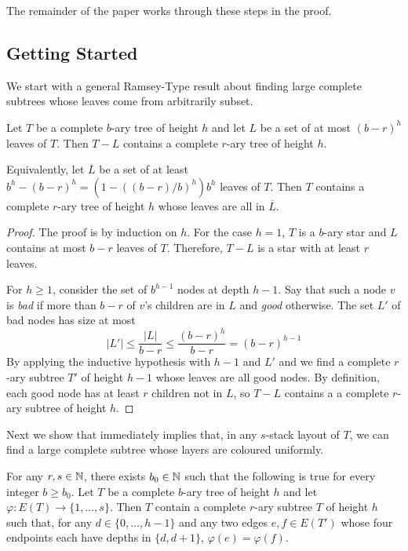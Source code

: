 \documentclass[kpfonts]{patmorin}
\begin{document}
The remainder of the paper works through these steps in the proof.


\subsection{Getting Started}


We start with a general Ramsey-Type result about finding large complete subtrees whose leaves come from arbitrarily subset.

\begin{lem}
  Let $T$ be a complete $b$-ary tree of height $h$ and let $L$ be a set of at most $(b-r)^h$ leaves of $T$.  Then $T-L$ contains a complete $r$-ary tree of height $h$.
  
  Equivalently, let $\overline{L}$ be a set of at least $b^h-(b-r)^h=(1-((b-r)/b)^h)b^h$ leaves of $T$.  Then $T$ contains a complete $r$-ary tree of height $h$ whose leaves are all in $\overline{L}$.
\end{lem}

\begin{proof}
  The proof is by induction on $h$.  For the case $h=1$, $T$ is a $b$-ary star and $L$ contains at most $b-r$ leaves of $T$.  Therefore, $T-L$ is a star with at least $r$ leaves.
  
  For $h\ge 1$, consider the set of $b^{h-1}$ nodes at depth $h-1$.  Say that such a node $v$ is \emph{bad} if more than $b-r$ of $v$'s children are in $L$ and \emph{good} otherwise.  The set $L'$ of bad nodes has size at most
  \[  |L'|\le \frac{|L|}{b-r} \le \frac{(b-r)^h}{b-r} = (b-r)^{h-1} \]
  By applying the inductive hypothesis with $h-1$ and $L'$ and we find a complete $r$-ary subtree $T'$ of height $h-1$ whose leaves are all good nodes.  By definition, each good node has at least $r$ children not in $L$, so $T-L$ contains a a complete $r$-ary subtree of height $h$.
\end{proof}  

Next we show that  immediately implies that, in any $s$-stack layout of $T$, we can find a large complete subtree whose layers are coloured uniformly.

\begin{lem}
  For any $r,s\in\mathbb{N}$, there exists $b_0\in\mathbb{N}$ such that the following is true for every integer $b\ge b_0$.  Let $T$ be a complete $b$-ary tree of height $h$ and let $\varphi:E(T)\to\{1,\ldots,s\}$.  Then $T$ contain a complete $r$-ary subtree $T$ of height $h$ such that, for any $d\in\{0,\ldots,h-1\}$ and any two edges $e,f\in E(T')$ whose four endpoints each have depths in $\{d,d+1\}$, $\varphi(e)=\varphi(f)$. 
\end{lem}
\end{document}
